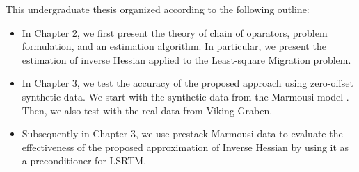 This undergraduate thesis organized according to the following outline:

 
\begin{itemize}

\item In Chapter 2, we first present the theory of chain of oparators, problem formulation, and an estimation algorithm. In particular, we present the estimation of inverse Hessian applied to the Least-square Migration problem. 

\item In Chapter 3, we test the accuracy of the proposed approach using zero-offset synthetic data. We start with the synthetic data from the Marmousi model \cite[]{versteeg1994}. Then, we also test with the real data from Viking Graben. 

\item Subsequently in Chapter 3, we use prestack Marmousi data  to evaluate the effectiveness of the proposed approximation of Inverse Hessian  by using it as a preconditioner for LSRTM.
\end{itemize}
